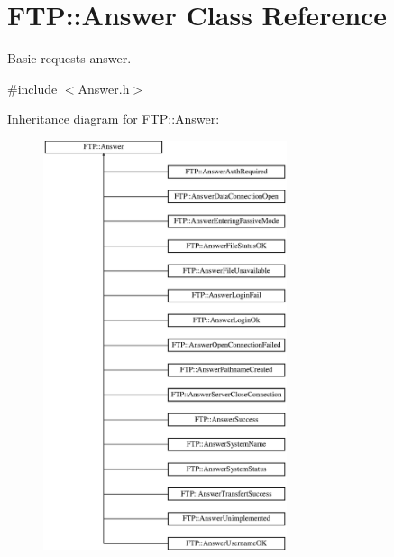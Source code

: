 \hypertarget{classFTP_1_1Answer}{}\section{F\+T\+P\+:\+:Answer Class Reference}
\label{classFTP_1_1Answer}


Basic request\textquotesingle{}s answer.  




{\ttfamily \#include $<$Answer.\+h$>$}

Inheritance diagram for F\+T\+P\+:\+:Answer\+:\begin{figure}[H]
\begin{center}
\leavevmode
\includegraphics[height=12.000000cm]{classFTP_1_1Answer}
\end{center}
\end{figure}
